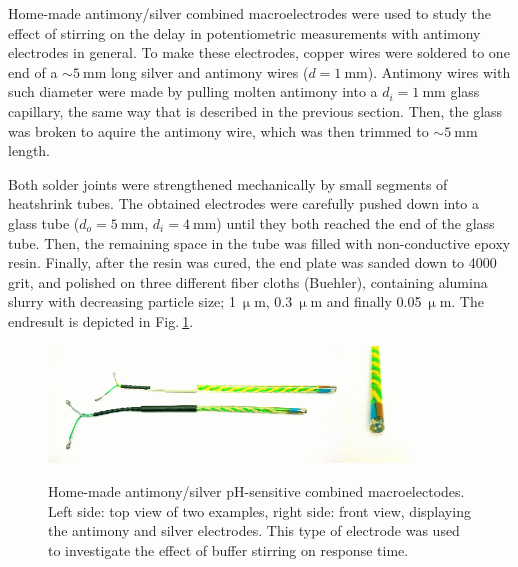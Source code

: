 Home-made antimony/silver combined macroelectrodes were used to study the effect of stirring on the delay in potentiometric measurements with antimony electrodes in general.
To make these electrodes, copper wires were soldered to one end of a $\sim 5~$mm long silver and antimony wires ($d = 1~$mm).
Antimony wires with such diameter were made by pulling molten antimony into a $d_i = 1~$mm glass capillary, the same way that is described in the previous section.
Then, the glass was broken to aquire the antimony wire, which was then trimmed to $\sim 5~$mm length.

Both solder joints were strengthened mechanically by small segments of heatshrink tubes.
The obtained electrodes were carefully pushed down into a glass tube ($d_o = 5~$mm, $d_i=4~$mm) until they both reached the end of the glass tube.
Then, the remaining space in the tube was filled with non-conductive epoxy resin.
Finally, after the resin was cured, the end plate was sanded down to 4000 grit, and polished on three different fiber cloths (Buehler), containing alumina slurry with decreasing particle size; 1$~\upmu$m, 0.3$~\upmu$m and finally 0.05$~\upmu$m. The endresult is depicted in Fig.$~$\ref{fig:sb_macro}.

\begin{figure}
\centering
\includegraphics[width=0.693\textwidth]{img/sb_ag_top.jpg}\includegraphics[width=0.165\textwidth]{img/sb_ag_front.jpg}
\caption[Home-made antimony/silver pH-sensitive combined macroelectrodes.]{Home-made antimony/silver pH-sensitive combined macroelectodes.
Left side: top view of two examples, right side: front view, displaying the antimony and silver electrodes. This type of electrode was used to investigate the effect of buffer stirring on response time.}
\label{fig:sb_macro}
\end{figure}

